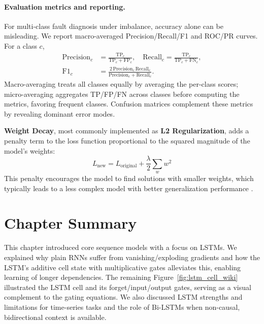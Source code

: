 \paragraph{Evaluation metrics and reporting.} For multi-class fault diagnosis under imbalance, accuracy alone can be misleading. We report macro-averaged Precision/Recall/F1 and ROC/PR curves. For a class \(c\),
\begin{align}
\mathrm{Precision}_c &= \frac{\mathrm{TP}_c}{\mathrm{TP}_c + \mathrm{FP}_c},\quad
\mathrm{Recall}_c = \frac{\mathrm{TP}_c}{\mathrm{TP}_c + \mathrm{FN}_c},\\
\mathrm{F1}_c &= \frac{2\,\mathrm{Precision}_c\,\mathrm{Recall}_c}{\mathrm{Precision}_c+\mathrm{Recall}_c}.
\end{align}
Macro-averaging treats all classes equally by averaging the per-class scores; micro-averaging aggregates TP/FP/FN across classes before computing the metrics, favoring frequent classes. Confusion matrices complement these metrics by revealing dominant error modes.

\textbf{Weight Decay}, most commonly implemented as \textbf{L2 Regularization}, adds a penalty term to the loss function proportional to the squared magnitude of the model's weights:
\begin{equation}
L_{\text{new}} = L_{\text{original}} + \frac{\lambda}{2} \sum_{w} w^2
\label{eq:l2_reg}
\end{equation}
This penalty encourages the model to find solutions with smaller weights, which typically leads to a less complex model with better generalization performance \citep{goodfellow2016deep}.


\section{Chapter Summary}
\label{sec:related_technologies:summary}

This chapter introduced core sequence models with a focus on LSTMs. We explained why plain RNNs suffer from vanishing/exploding gradients and how the LSTM’s additive cell state with multiplicative gates alleviates this, enabling learning of longer dependencies. The remaining Figure~\ref{fig:lstm_cell_wiki} illustrated the LSTM cell and its forget/input/output gates, serving as a visual complement to the gating equations. We also discussed LSTM strengths and limitations for time-series tasks and the role of Bi-LSTMs when non-causal, bidirectional context is available.
